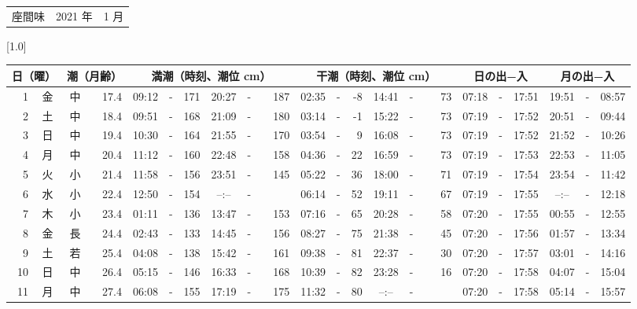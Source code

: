 \documentclass[12pt,a4j]{jsarticle}
\begin{document}
 \begin{table}[htbp]
 \begin{center}
 \begin{tabular}{lcc}
 \LARGE{座間味}  & \large{2021 年} & \large{ 1 月} \\
 \end{tabular}
 \end{center}
 \begin{center}
    \scalebox{0.7}[1.0]{
    \begin{tabular}{|rc|cr|ccrccr|ccrccr|ccc|ccc|}
    \hline
    \multicolumn{2}{|c|}{日（曜）} & \multicolumn{2}{c|}{潮（月齢）} & \multicolumn{6}{c|}{満潮（時刻、潮位 cm）} & \multicolumn{6}{c|}{干潮（時刻、潮位 cm）} & \multicolumn{3}{c|}{日の出−入} &  \multicolumn{3}{c|}{月の出−入}\\
 \hline
 1 & 金 & 中 & 17.4 &  09:12 &-& 171 &  20:27 &-& 187 &  02:35 &-&  -8 &  14:41 &-&  73 & 07:18 & -& 17:51 & 19:51 & -& 08:57 \\
 2 & 土 & 中 & 18.4 &  09:51 &-& 168 &  21:09 &-& 180 &  03:14 &-&  -1 &  15:22 &-&  73 & 07:19 & -& 17:52 & 20:51 & -& 09:44 \\
 3 & 日 & 中 & 19.4 &  10:30 &-& 164 &  21:55 &-& 170 &  03:54 &-&   9 &  16:08 &-&  73 & 07:19 & -& 17:52 & 21:52 & -& 10:26 \\
 4 & 月 & 中 & 20.4 &  11:12 &-& 160 &  22:48 &-& 158 &  04:36 &-&  22 &  16:59 &-&  73 & 07:19 & -& 17:53 & 22:53 & -& 11:05 \\
 5 & 火 & 小 & 21.4 &  11:58 &-& 156 &  23:51 &-& 145 &  05:22 &-&  36 &  18:00 &-&  71 & 07:19 & -& 17:54 & 23:54 & -& 11:42 \\
 6 & 水 & 小 & 22.4 &  12:50 &-& 154 &  --:-- &-&~~~~~ &  06:14 &-&  52 &  19:11 &-&  67 & 07:19 & -& 17:55 & --:-- & -& 12:18 \\
 7 & 木 & 小 & 23.4 &  01:11 &-& 136 &  13:47 &-& 153 &  07:16 &-&  65 &  20:28 &-&  58 & 07:20 & -& 17:55 & 00:55 & -& 12:55 \\
 8 & 金 & 長 & 24.4 &  02:43 &-& 133 &  14:45 &-& 156 &  08:27 &-&  75 &  21:38 &-&  45 & 07:20 & -& 17:56 & 01:57 & -& 13:34 \\
 9 & 土 & 若 & 25.4 &  04:08 &-& 138 &  15:42 &-& 161 &  09:38 &-&  81 &  22:37 &-&  30 & 07:20 & -& 17:57 & 03:01 & -& 14:16 \\
10 & 日 & 中 & 26.4 &  05:15 &-& 146 &  16:33 &-& 168 &  10:39 &-&  82 &  23:28 &-&  16 & 07:20 & -& 17:58 & 04:07 & -& 15:04 \\
11 & 月 & 中 & 27.4 &  06:08 &-& 155 &  17:19 &-& 175 &  11:32 &-&  80 &  --:-- &-&~~~~~ & 07:20 & -& 17:58 & 05:14 & -& 15:57 \\

\end{tabular}}
\end{center}
\end{table}
\end{document}
